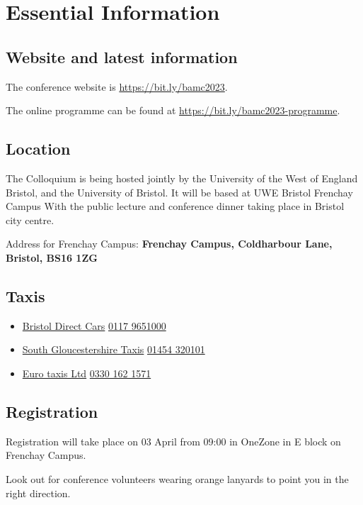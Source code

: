 \documentclass[12pt,a4paper]{article}
\begin{document}
\section{Essential Information}

\subsection{Website and latest information}

The conference website is \href{https://bit.ly/bamc2023}{https://bit.ly/bamc2023}.

The online programme can be found at \href{https://bit.ly/bamc2023-programme}{https://bit.ly/bamc2023-programme}.

\subsection{Location}

The Colloquium is being hosted jointly by the University of the West of England Bristol, and the University of Bristol. It will be based at UWE Bristol Frenchay Campus With the public lecture and conference dinner taking place in Bristol city centre.

Address for Frenchay Campus: \textbf{Frenchay Campus, Coldharbour Lane, Bristol, BS16 1ZG}

\subsection{Taxis}

\begin{itemize}
\item \href{http://www.bristoldirectcars.co.uk/}{Bristol Direct Cars} \href{tel:01179651000}{0117 9651000}
\item \href{http://www.southgloscabs.co.uk/}{South Gloucestershire Taxis} \href{tel:01454320101}{01454 320101}
\item \href{https://www.eurotaxis.com/taxis/}{Euro taxis Ltd} \href{tel:03301621571}{0330 162 1571}
\end{itemize}

\subsection{Registration}

Registration will take place on 03 April from 09:00 in OneZone in E block on Frenchay Campus.

Look out for conference volunteers wearing orange lanyards to point you in the right direction.
\end{document}

